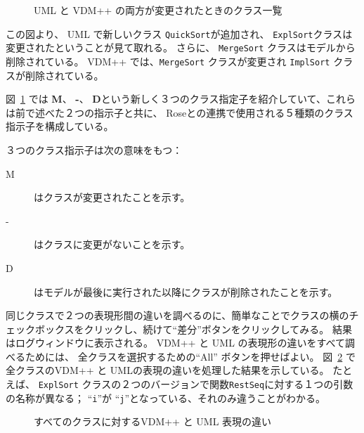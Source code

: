 \documentclass[\pformat,12pt]{jarticle}
\newcommand{\vdmpp}{VDM++}
\newcommand{\link}{Roseとの連携}
\begin{document}
\begin{figure}[htb]
\begin{center}
\mbox{}
\caption{UML と \vdmpp{} の両方が変更されたときのクラス一覧　\label{fig:mergeUMLVDM}}
\end{center}
\end{figure}

この図より、 UML で新しいクラス {\tt QuickSort}が追加され、 {\tt ExplSort}クラスは変更されたということが見て取れる。
さらに、 {\tt MergeSort} クラスはモデルから削除されている。
\vdmpp{} では、{\tt MergeSort} クラスが変更され {\tt ImplSort} クラスが削除されている。

図~\ref{fig:mergeUMLVDM} では {\bf M}、 {\bf -}、 {\bf D}という新しく３つのクラス指定子を紹介していて、これらは前で述べた２つの指示子と共に、 \link{}で使用される５種類のクラス指示子を構成している。
 
３つのクラス指示子は次の意味をもつ：

\begin{description}  
\item [M] はクラスが変更されたことを示す。
\item [-] はクラスに変更がないことを示す。
\item [D] はモデルが最後に実行された以降にクラスが削除されたことを示す。
\end{description}  

同じクラスで２つの表現形間の違いを調べるのに、簡単なことでクラスの横のチェックボックスをクリックし、続けて``差分''ボタンをクリックしてみる。
結果はログウィンドウに表示される。
\vdmpp{} と UML の表現形の違いをすべて調べるためには、 全クラスを選択するための``All'' ボタンを押せばよい。
図~\ref{fig:diffs} で全クラスの\vdmpp{} と UMLの表現の違いを処理した結果を示している。
たとえば、 {\tt ExplSort} クラスの２つのバージョンで関数{\tt RestSeq}に対する１つの引数の名称が異なる； ``{\tt i}''が ``{\tt j}''となっている、それのみ違うことがわかる。

\begin{figure}[htb]
\begin{center}
\mbox{}
\caption{すべてのクラスに対する\vdmpp{} と UML 表現の違い　\label{fig:diffs}}
\end{center}
\end{figure}
\end{document}
